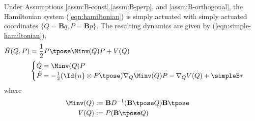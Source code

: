 \begin{thm}
    Under Assumptions \ref{assm:B-const},\ref{assm:B-perp}, and
    \ref{assm:B-orthogonal}, the Hamiltonian system (\ref{eqn:hamiltonian}) is
    simply actuated with simply actuated coordinates 
    \(\{Q = \mathbf{B}q, P = \mathbf{B}p\}\). The resulting dynamics are 
    given by (\ref{eqn:simple-hamiltonian}),
    \begin{align}\label{eqn:simple-hamiltonian}
        \hat{H}(Q,P) &= 
        \frac{1}{2} P\tpose \Minv(Q) P + V(Q) \\
       &\begin{cases}
            \dot{Q} = \Minv(Q)P \\
            \dot{P} = -\frac{1}{2} (\Id{n} \otimes P\tpose) \nabla_Q \Minv(Q) P
                - \nabla_Q V(Q) + \simpleB \tau
        \end{cases} \nonumber
    \end{align}
    where
    \begin{align*}
        \Minv(Q) &:= \mathbf{B}D^{-1}(\mathbf{B}\tpose Q)\mathbf{B}\tpose \\
        V(Q) &:= P(\mathbf{B}\tpose Q) \\
    \end{align*}
\end{thm}
